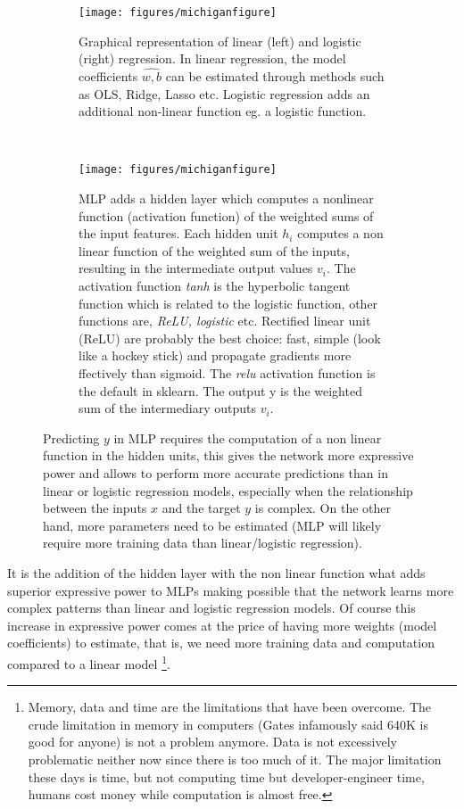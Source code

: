 \documentclass[11pt]{article}
\begin{document}
\begin{figure}[H]
    \centering
    \begin{subfigure}[t]{.8\textwidth}
        \centering
        \texttt{[image: figures/michiganfigure]}
        \caption{Graphical representation of linear (left) and logistic (right) regression. In linear regression, the model coefficients $\hat{w,b}$ can be estimated through methods such as OLS, Ridge, Lasso etc. Logistic regression adds an additional non-linear function eg. a logistic function.}
    \end{subfigure}
    ~ 
    \begin{subfigure}[t]{.8\textwidth}
        \centering
        \texttt{[image: figures/michiganfigure]}
        \caption{MLP adds a hidden layer which computes a nonlinear function (activation function) of the weighted sums of the input features. Each hidden unit $h_i$ computes a non linear function of the weighted sum of the inputs, resulting in the intermediate output values $v_i$. The activation function \textit{tanh} is the hyperbolic tangent function which is related to the logistic function, other functions are, \textit{ReLU, logistic} etc. Rectified linear unit (ReLU) are probably the best choice: fast, simple (look like a hockey stick) and propagate gradients more ffectively than sigmoid. The \textit{relu} activation function is the default in sklearn. The output y is the weighted sum of the intermediary outputs $v_i$.}
    \end{subfigure}%
    \label{fig:mich}
    \caption{Predicting $y$ in MLP requires the computation of a non linear function in the hidden units, this gives the network more expressive power and allows to perform more accurate predictions than in linear or logistic regression models, especially when the relationship between the inputs $x$ and the target $y$ is complex. On the other hand, more parameters need to be estimated (MLP will likely require more training data than linear/logistic regression).}
\end{figure}

It is the addition of the hidden layer with the non linear function what adds superior expressive power to MLPs making possible that the network learns more complex patterns than linear and logistic regression models. Of course this increase in expressive power comes at the price of having more weights (model coefficients) to estimate, that is, we need more training data and computation compared to a linear model \footnote{Memory, data and time are the limitations that have been overcome. The crude limitation in memory in computers (Gates infamously said  640K is good for anyone) is not a problem anymore. Data is not excessively problematic neither now since there is too much of it. The major limitation these days is time, but not computing time but developer-engineer time, humans cost money while computation is almost free.}.
\end{document}
